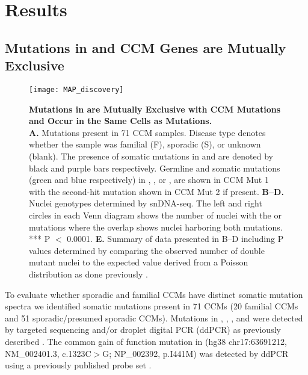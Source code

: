 \section{Results}
\subsection{Mutations in  and CCM Genes are Mutually Exclusive}

\begin{figure}[tbh]
\centering
\texttt{[image: MAP\_discovery]}
\caption[ Somatic Mutations and Cellular Phase in CCM]{\textbf{Mutations in  are Mutually Exclusive with CCM Mutations and Occur in the Same Cells as  Mutations.\\} 
\textbf{A.} Mutations present in 71 CCM samples. Disease type denotes whether the sample was familial (F), sporadic (S), or unknown (blank). The presence of somatic mutations in  and  are denoted by black and purple bars respectively. Germline and somatic mutations (green and blue respectively) in , , or , are shown in CCM Mut 1 with the second-hit mutation shown in CCM Mut 2 if present. \textbf{B--D.} Nuclei genotypes determined by snDNA-seq. The left and right circles in each Venn diagram shows the number of nuclei with the  or  mutations where the overlap shows nuclei harboring both mutations. *** P $<$ 0.0001. \textbf{E.} Summary of data presented in B--D including P values determined by comparing the observed number of double mutant nuclei to the expected value derived from a Poisson distribution as done previously \citep{ren2021}. }

\label{MAP_discovery}
\end{figure}

To evaluate whether sporadic and familial CCMs have distinct somatic mutation spectra we identified somatic mutations present in 71 CCMs (20 familial CCMs and 51 sporadic/presumed sporadic CCMs). Mutations in , , , and  were detected by targeted sequencing and/or droplet digital PCR (ddPCR) as previously described \citep{ren2021}. The common gain of function mutation in  (hg38 chr17:63691212, NM\_002401.3, c.1323C$>$G; NP\_002392, p.I441M) was detected by ddPCR using a previously published probe set \citep{couto2015}. 

